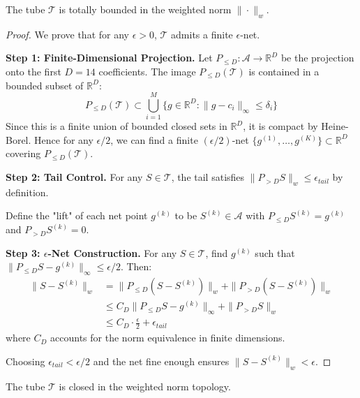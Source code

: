 \begin{lemma}
\label{lem:tube_total_bounded}
The tube $\mathcal{T}$ is totally bounded in the weighted norm $\|\cdot\|_w$.
\end{lemma}

\begin{proof}
We prove that for any $\epsilon > 0$, $\mathcal{T}$ admits a finite $\epsilon$-net.

\textbf{Step 1: Finite-Dimensional Projection.}
Let $P_{\le D}: \mathcal{A} \to \mathbb{R}^D$ be the projection onto the first $D=14$ coefficients. The image $P_{\le D}(\mathcal{T})$ is contained in a bounded subset of $\mathbb{R}^D$:
\begin{equation}
P_{\le D}(\mathcal{T}) \subset \bigcup_{i=1}^M \{g \in \mathbb{R}^D : \|g - c_i\|_\infty \leq \delta_i\}
\end{equation}
Since this is a finite union of bounded closed sets in $\mathbb{R}^D$, it is compact by Heine-Borel. Hence for any $\epsilon/2$, we can find a finite $(\epsilon/2)$-net $\{g^{(1)}, \ldots, g^{(K)}\} \subset \mathbb{R}^D$ covering $P_{\le D}(\mathcal{T})$.

\textbf{Step 2: Tail Control.}
For any $S \in \mathcal{T}$, the tail satisfies $\|P_{>D} S\|_w \leq \epsilon_{tail}$ by definition. 

Define the "lift" of each net point $g^{(k)}$ to be $S^{(k)} \in \mathcal{A}$ with $P_{\le D} S^{(k)} = g^{(k)}$ and $P_{>D} S^{(k)} = 0$.

\textbf{Step 3: $\epsilon$-Net Construction.}
For any $S \in \mathcal{T}$, find $g^{(k)}$ such that $\|P_{\le D} S - g^{(k)}\|_\infty \leq \epsilon/2$. Then:
\begin{align}
\|S - S^{(k)}\|_w &= \|P_{\le D}(S - S^{(k)})\|_w + \|P_{>D}(S - S^{(k)})\|_w \\
&\leq C_D \|P_{\le D} S - g^{(k)}\|_\infty + \|P_{>D} S\|_w \\
&\leq C_D \cdot \frac{\epsilon}{2} + \epsilon_{tail}
\end{align}
where $C_D$ accounts for the norm equivalence in finite dimensions.

Choosing $\epsilon_{tail} < \epsilon/2$ and the net fine enough ensures $\|S - S^{(k)}\|_w < \epsilon$.
\end{proof}

\begin{lemma}
\label{lem:tube_closed}
The tube $\mathcal{T}$ is closed in the weighted norm topology.
\end{lemma}

